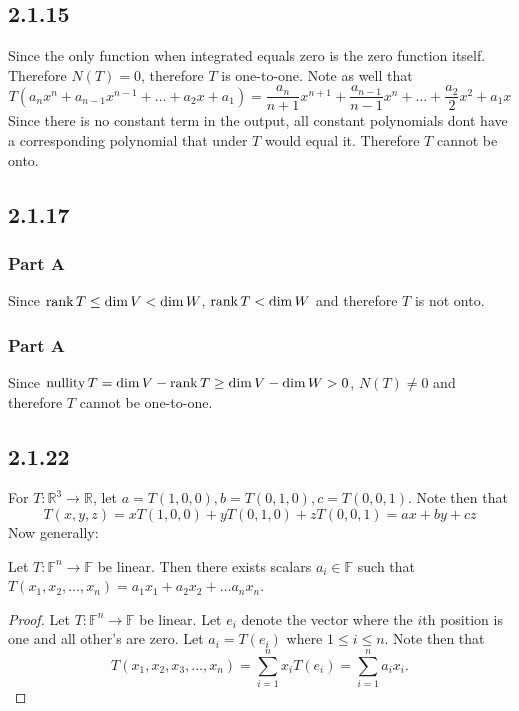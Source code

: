 \documentclass[12pt,titlepage]{extarticle}
\begin{document}
\subsection*{2.1.15}
Since the only function when integrated equals zero is the zero function itself. Therefore $N(T) = \qty{0}$, therefore $T$ is one-to-one. Note as well that
\[
    T(a_n x^n + a_{n-1} x^{n-1} + \ldots + a_{2} x + a_1) = \frac{a_n}{n+1} x^{n+1} + \frac{a_{n-1}}{n-1} x^n + \ldots + \frac{a_{2}}{2} x^2 + a_1 x
\]
Since there is no constant term in the output, all constant polynomials dont have a corresponding polynomial that under $T$ would equal it. Therefore $T$ cannot be onto.

\subsection*{2.1.17}
\subsubsection*{Part A}
Since $\rank T \leq \dim V < \dim W$, $\rank T < \dim W$ and therefore $T$ is not onto.

\subsubsection*{Part A}
Since $\operatorname{nullity} T = \dim V - \rank T \geq \dim V - \dim W > 0$, $N(T) \neq \qty{0}$ and therefore $T$ cannot be one-to-one. 

\subsection*{2.1.22}
For $T : \mathbb{R}^3 \to \mathbb{R}$, let $a = T(1,0,0), b = T(0,1,0), c = T(0,0,1)$. Note then that
\[
    T(x,y,z) = x T(1,0,0) + y T(0,1,0) + z T(0,0,1) = ax + by + cz
\]
Now generally:
\begin{theorem}
    Let $T : \mathbb{F}^n \to \mathbb{F}$ be linear. Then there exists scalars $a_i \in \mathbb{F}$ such that $T(x_1, x_2, \ldots, x_n) = a_1 x_1 + a_2 x_2 + \ldots a_n x_n$.
\end{theorem}
\begin{proof}
    Let $T : \mathbb{F}^n \to \mathbb{F}$ be linear. Let $e_i$ denote the vector where the $i$th position is one and all other's are zero. Let $a_i = T(e_i)$ where $1 \leq i \leq n$. Note then that
    \[
        T(x_1, x_2, x_3, \ldots, x_n) = \sum_{i=1}^{n} x_i T(e_i) = \sum_{i=1}^n a_i x_i.
    \]
\end{proof}
\end{document}

